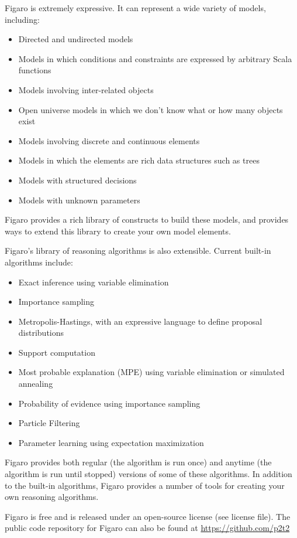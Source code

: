 Figaro is extremely expressive. It can represent a wide variety of models, including:
\begin{itemize}
\item Directed and undirected models
\item Models in which conditions and constraints are expressed by arbitrary Scala functions
\item Models involving inter-related objects
\item Open universe models in which we don't know what or how many objects exist
\item Models involving discrete and continuous elements
\item Models in which the elements are rich data structures such as trees
\item Models with structured decisions
\item Models with unknown parameters
\end{itemize}

Figaro provides a rich library of constructs to build these models, and provides ways to extend this library to create your own model elements.

Figaro's library of reasoning algorithms is also extensible. Current built-in algorithms include:
\begin{itemize}
\item Exact inference using variable elimination
\item Importance sampling
\item Metropolis-Hastings, with an expressive language to define proposal distributions
\item Support computation
\item Most probable explanation (MPE) using variable elimination or simulated annealing
\item Probability of evidence using importance sampling
\item Particle Filtering
\item Parameter learning using expectation maximization
\end{itemize}

Figaro provides both regular (the algorithm is run once) and anytime (the algorithm is run until stopped) versions of some of these algorithms. In addition to the built-in algorithms, Figaro provides a number of tools for creating your own reasoning algorithms.

Figaro is free and is released under an open-source license (see license file). The public code
repository for Figaro can also be found at \url{https://github.com/p2t2}


